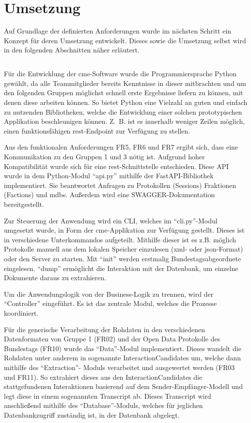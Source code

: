 \section{Umsetzung}\label{sec:03_02_umsetzung}
Auf Grundlage der definierten Anforderungen wurde im nächsten Schritt ein
Konzept für deren Umsetzung entwickelt. Dieses sowie die Umsetzung selbst
wird in den folgenden Abschnitten näher erläutert.

\subsection{}
Für die Entwicklung der \gls{cme}-Software wurde die Programmiersprache Python
gewählt, da alle Teammitglieder bereits Kenntnisse in dieser mitbrachten und
um den folgenden Gruppen möglichst schnell erste Ergebnisse liefern zu können,
mit denen diese arbeiten können. So bietet Python eine Vielzahl an guten und
einfach zu nutzenden Bibliotheken, welche die Entwicklung einer solchen
prototypischen Applikation beschleunigen können. Z.~B. ist es innerhalb
weniger Zeilen möglich, einen funktionsfähigen \gls{rest}-Endpoint zur
Verfügung zu stellen.

Aus den funktionalen Anforderungen FR5, FR6 und FR7 ergibt sich, dass eine
Kommunikation zu den Gruppen 1 und 3 nötig ist. Aufgrund hoher Kompatibilität
wurde sich für eine \gls{rest}-Schnittstelle entschieden. Diese API wurde in dem
Python-Modul \enquote{api.py} mithilfe der FastAPI-Bibliothek implementiert. Sie
beantwortet Anfragen zu Protokollen (Sessions) Fraktionen (Factions) und
\glspl{mdb}. Außerdem wird eine SWAGGER-Dokumentation
bereitgestellt.

Zur Steuerung der Anwendung wird ein CLI, welches im \enquote{cli.py}-Modul umgesetzt
wurde, in Form der cme-Applikation zur Verfügung gestellt. Dieses ist in
verschiedene Unterkommandos aufgeteilt. Mithilfe dieser ist es z.B. möglich
Protokolle manuell aus dem lokalen Speicher einzulesen (\gls{xml}- oder \gls{json}-Format)
oder den Server zu starten. Mit \enquote{init} werden erstmalig Bundestagsabgeordnete
eingelesen. \enquote{dump} ermöglicht die Interaktion mit der Datenbank, um einzelne
Dokumente daraus zu extrahieren.

Um die Anwendungslogik von der Business-Logik zu trennen, wird der \enquote{Controller}
eingeführt. Es ist das zentrale Modul, welches die Prozesse koordiniert.

Für die generische Verarbeitung der Rohdaten in den verschiedenen Datenformaten
von Gruppe 1 (FR02) und der Open Data Protokolle des Bundestags (FR10) wurde
das \enquote{Data}-Modul implementiert. Dieses wandelt die Rohdaten unter anderem in
sogenannte InteractionCandidates um, welche dann mithilfe des \enquote{Extraction}-
Moduls verarbeitet und ausgewertet werden (FR03 und FR11). So extrahiert dieses
aus den InteractionCandidates die stattgefundenen Interaktionen basierend auf
dem Sender-Empfänger-Modell und legt diese in einem sogenannten Transcript ab.
Dieses Transcript wird anschließend mithilfe des \enquote{Database}-Moduls, welches für
jeglichen Datenbankzugriff zuständig ist, in der Datenbank abgelegt.

